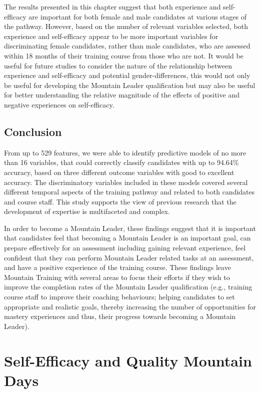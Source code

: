 \documentclass[
  12pt,
  a4paper,
]{book}
\begin{document}
The results presented in this chapter suggest that both experience and self-efficacy are important for both female and male candidates at various stages of the pathway. However, based on the number of relevant variables selected, both experience and self-efficacy appear to be more important variables for discriminating female candidates, rather than male candidates, who are assessed within 18 months of their training course from those who are not. It would be useful for future studies to consider the nature of the relationship between experience and self-efficacy and potential gender-differences, this would not only be useful for developing the Mountain Leader qualification but may also be useful for better understanding the relative magnitude of the effects of positive and negative experiences on self-efficacy.

\hypertarget{conclusion}{%
\section{Conclusion}\label{conclusion}}

From up to 529 features, we were able to identify predictive models of no more than 16 variables, that could correctly classify candidates with up to 94.64\% accuracy, based on three different outcome variables with good to excellent accuracy. The discriminatory variables included in these models covered several different temporal aspects of the training pathway and related to both candidates and course staff. This study supports the view of previous research that the development of expertise is multifaceted and complex.

In order to become a Mountain Leader, these findings suggest that it is important that candidates feel that becoming a Mountain Leader is an important goal, can prepare effectively for an assessment including gaining relevant experience, feel confident that they can perform Mountain Leader related tasks at an assessment, and have a positive experience of the training course. These findings leave Mountain Training with several areas to focus their efforts if they wish to improve the completion rates of the Mountain Leader qualification (e.g., training course staff to improve their coaching behaviours; helping candidates to set appropriate and realistic goals, thereby increasing the number of opportunities for mastery experiences and thus, their progress towards becoming a Mountain Leader).

\hypertarget{self-efficacy-qmds}{%
\chapter{Self-Efficacy and Quality Mountain Days}\label{self-efficacy-qmds}}
\end{document}
